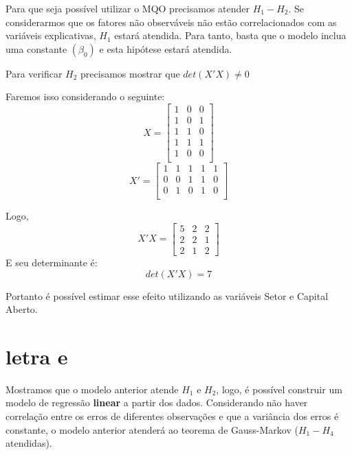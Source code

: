 Para que seja possível utilizar o MQO precisamos atender \(H_{1}-H_{2}\). Se considerarmos que os fatores não observáveis não estão correlacionados com as variáveis explicativas, \(H_{1}\) estará atendida. Para tanto, basta que o modelo inclua uma constante \((\beta_{0})\) e esta hipótese estará atendida.

Para verificar \(H_{2}\) precisamos mostrar que \(det(X'X) \neq 0\)

Faremos isso considerando o seguinte:
\[ X =
    \begin{bmatrix}
         1 & 0 & 0 \\
         1 & 0 & 1 \\
         1 & 1 & 0 \\
         1 & 1 & 1 \\
         1 & 0 & 0 \\
    \end{bmatrix}
\]
\[ X' =
    \begin{bmatrix}
         1 & 1 & 1 & 1 & 1 \\
         0 & 0 & 1 & 1 & 0\\
         0 & 1 & 0 & 1 & 0\\
    \end{bmatrix}
\]

Logo,
\[ X'X = 
    \begin{bmatrix}
        5 & 2 & 2 \\
        2 & 2 & 1 \\
        2 & 1 & 2
    \end{bmatrix}
\]
E seu determinante é:
\[ det(X'X) = 7\]

Portanto é possível estimar esse efeito utilizando as variáveis Setor e Capital Aberto.

\section{letra e}
Mostramos que o modelo anterior atende \(H_{1}\) e \(H_{2}\), logo, é possível construir um modelo de regressão \textbf{linear} a partir dos dados. Considerando não haver correlação entre os erros de diferentes observações e que a variância dos erros é constante, o modelo anterior atenderá ao teorema de Gauss-Markov (\(H_{1}-H_{4}\) atendidas).


